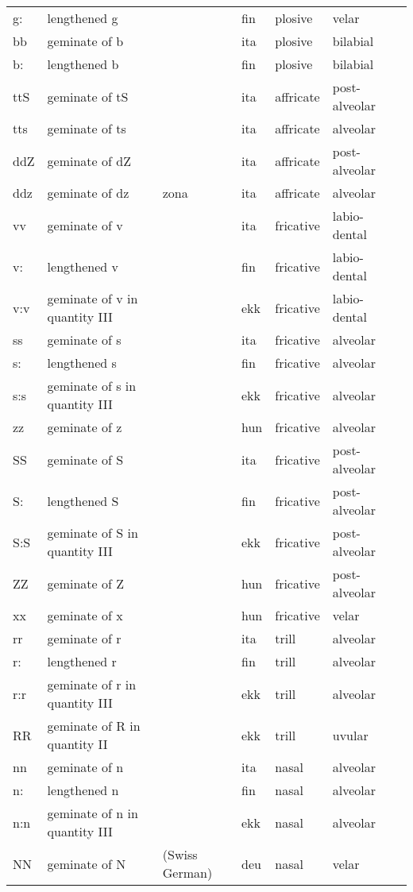 \begin{longtable}{l|p{.3\linewidth}|p{.15\linewidth}|l|l|l|l}
	g:	& lengthened g	& 	& fin	& plosive	& velar	\\
	bb	& geminate of b	& 	& ita	& plosive	& bilabial	\\
	b:	& lengthened b	& 	& fin	& plosive	& bilabial	\\
	ttS	& geminate of tS	& 	& ita	& affricate	& post-alveolar	\\
	tts	& geminate of ts	& 	& ita	& affricate	& alveolar	\\
	ddZ	& geminate of dZ	& 	& ita	& affricate	& post-alveolar	\\
	ddz	& geminate of dz	& zona	& ita	& affricate	& alveolar	\\
	vv	& geminate of v	& 	& ita	& fricative	& labio-dental	\\
	v:	& lengthened v	& 	& fin	& fricative	& labio-dental	\\
	v:v	& geminate of v in quantity III	& 	& ekk	& fricative	& labio-dental	\\
	ss	& geminate of s	& 	& ita	& fricative	& alveolar	\\
	s:	& lengthened s	& 	& fin	& fricative	& alveolar	\\
	s:s	& geminate of s in quantity III	& 	& ekk	& fricative	& alveolar	\\
	zz	& geminate of z	& 	& hun	& fricative	& alveolar	\\
	SS	& geminate of S	& 	& ita	& fricative	& post-alveolar	\\
	S:	& lengthened S	& 	& fin	& fricative	& post-alveolar	\\
	S:S	& geminate of S in quantity III	& 	& ekk	& fricative	& post-alveolar	\\
	ZZ	& geminate of Z	& 	& hun	& fricative	& post-alveolar	\\
	xx	& geminate of x	& 	& hun	& fricative	& velar	\\
	rr	& geminate of r	& 	& ita	& trill	& alveolar	\\
	r:	& lengthened r	& 	& fin	& trill	& alveolar	\\
	r:r	& geminate of r in quantity III	& 	& ekk	& trill	& alveolar	\\
	RR	& geminate of R in quantity II	& 	& ekk	& trill	& uvular	\\
	nn	& geminate of n	& 	& ita	& nasal	& alveolar	\\
	n:	& lengthened n	& 	& fin	& nasal	& alveolar	\\
	n:n	& geminate of n in quantity III	& 	& ekk	& nasal	& alveolar	\\
	NN	& geminate of N	& (Swiss German)	& deu	& nasal	& velar	\\

\end{longtable}
